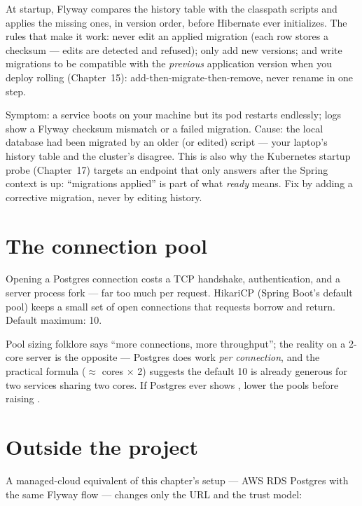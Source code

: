 At startup, Flyway compares the history table with the classpath scripts
and applies the missing ones, in version order, before Hibernate ever
initializes. The rules that make it work: never edit an applied
migration (each row stores a checksum --- edits are detected and refused);
only add new versions; and write migrations to be compatible with the
\emph{previous} application version when you deploy rolling
(Chapter~15): add-then-migrate-then-remove, never rename in one step.

\begin{pitfall}
Symptom: a service boots on your machine but its pod restarts endlessly;
logs show a Flyway checksum mismatch or a failed migration. Cause: the
local database had been migrated by an older (or edited) script --- your
laptop's history table and the cluster's disagree. This is also why the
Kubernetes startup probe (Chapter~17) targets an endpoint that only
answers after the Spring context is up: ``migrations applied'' is part of
what \emph{ready} means. Fix by adding a corrective migration, never by
editing history.
\end{pitfall}

\section{The connection pool}

Opening a Postgres connection costs a TCP handshake, authentication, and
a server process fork --- far too much per request. HikariCP (Spring
Boot's default pool) keeps a small set of open connections that requests
borrow and return. Default maximum: 10.

\begin{hardware}
Pool sizing folklore says ``more connections, more throughput''; the
reality on a 2-core server is the opposite --- Postgres does work
\emph{per connection}, and the practical formula
(\(\approx\) cores $\times$ 2) suggests the default 10 is already
generous for two services sharing two cores. If Postgres ever shows
, lower the pools before raising
.
\end{hardware}

\section{Outside the project}

A managed-cloud equivalent of this chapter's setup --- AWS RDS Postgres
with the same Flyway flow --- changes only the URL and the trust model:

